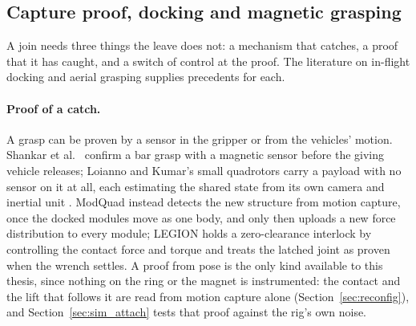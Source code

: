 
\subsection{Capture proof, docking and magnetic grasping}
\label{sec:lit_capture}

A join needs three things the leave does not: a mechanism that catches, a proof that it has caught, and a switch
of control at the proof. The literature on in-flight docking and aerial grasping supplies precedents for each.

\paragraph{Proof of a catch.} A grasp can be proven by a sensor in the gripper or from the vehicles' motion. Shankar
et al.\ \cite{shankar2020inflight} confirm a bar grasp with a magnetic sensor before the giving vehicle releases; Loianno and Kumar's small
quadrotors carry a payload with no sensor on it at all, each estimating the shared state from its own camera and
inertial unit \cite{loianno2018cooperative}. ModQuad
\cite{saldana2018modquad} instead detects the new structure from motion capture, once the docked modules move as
one body, and only then uploads a new force distribution to every module; LEGION \cite{sugihara2026legion} holds a
zero-clearance interlock by controlling the contact force and torque and treats the latched joint as proven when
the wrench settles. A proof from pose is the only kind available to this thesis, since nothing on the ring or the
magnet is instrumented: the contact and the lift that follows it are read from motion capture alone
(Section~\ref{sec:reconfig}), and Section~\ref{sec:sim_attach} tests that proof against the rig's own noise.

